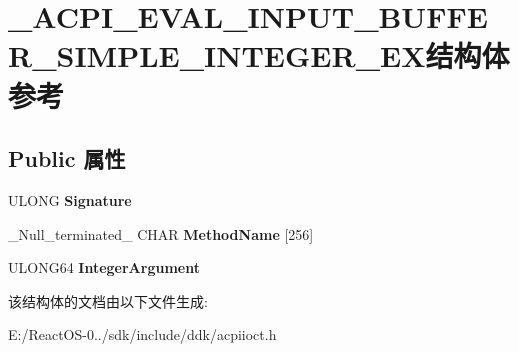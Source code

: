 \hypertarget{struct___a_c_p_i___e_v_a_l___i_n_p_u_t___b_u_f_f_e_r___s_i_m_p_l_e___i_n_t_e_g_e_r___e_x}{}\section{\+\_\+\+A\+C\+P\+I\+\_\+\+E\+V\+A\+L\+\_\+\+I\+N\+P\+U\+T\+\_\+\+B\+U\+F\+F\+E\+R\+\_\+\+S\+I\+M\+P\+L\+E\+\_\+\+I\+N\+T\+E\+G\+E\+R\+\_\+\+E\+X结构体 参考}
\label{struct___a_c_p_i___e_v_a_l___i_n_p_u_t___b_u_f_f_e_r___s_i_m_p_l_e___i_n_t_e_g_e_r___e_x}
\subsection*{Public 属性}
\begin{DoxyCompactItemize}
\item 
\mbox{\label{struct___a_c_p_i___e_v_a_l___i_n_p_u_t___b_u_f_f_e_r___s_i_m_p_l_e___i_n_t_e_g_e_r___e_x_a52e83d3e5e9559458db2daee7c102d61}} 
U\+L\+O\+NG {\bfseries Signature}
\item 
\mbox{\label{struct___a_c_p_i___e_v_a_l___i_n_p_u_t___b_u_f_f_e_r___s_i_m_p_l_e___i_n_t_e_g_e_r___e_x_a3cc5c89b4eba4fde8aa0bd37804c8866}} 
\+\_\+\+Null\+\_\+terminated\+\_\+ C\+H\+AR {\bfseries Method\+Name} \mbox{[}256\mbox{]}
\item 
\mbox{\label{struct___a_c_p_i___e_v_a_l___i_n_p_u_t___b_u_f_f_e_r___s_i_m_p_l_e___i_n_t_e_g_e_r___e_x_a5cdb45e18ecc17b41b02605021d617ec}} 
U\+L\+O\+N\+G64 {\bfseries Integer\+Argument}
\end{DoxyCompactItemize}


该结构体的文档由以下文件生成\+:\begin{DoxyCompactItemize}
\item 
E\+:/\+React\+O\+S-\/0../sdk/include/ddk/acpiioct.\+h\end{DoxyCompactItemize}
